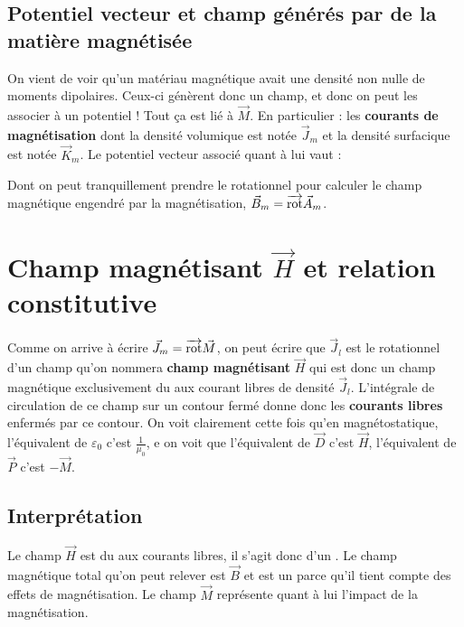 \documentclass[12pt]{book}
\begin{document}
\subsection{Potentiel vecteur et champ générés par de la matière magnétisée}
On vient de voir qu'un matériau magnétique avait une densité non nulle de moments dipolaires. Ceux-ci génèrent  donc un champ, et donc on peut les associer à un potentiel ! Tout ça est lié à $\vec{M}$. En particulier : les \textbf{courants de magnétisation} dont la densité volumique est notée $\vec{J}_m$ et la densité surfacique est notée $\vec{K}_m$. Le potentiel vecteur associé quant à lui vaut :

Dont on peut tranquillement prendre le rotationnel pour calculer le champ magnétique engendré par la magnétisation,  $\vec{B}_m = \overrightarrow{\text{rot}} \vec{A}_m$.
\section{Champ magnétisant $\vec{H}$ et relation constitutive}
Comme on arrive à écrire $\vec{J}_m = \overrightarrow{\text{rot}} \vec{M}$, on peut écrire que $\vec{J}_l$ est le rotationnel d'un champ qu'on nommera \textbf{champ magnétisant} $\vec{H}$ qui est donc un champ magnétique exclusivement du aux courant libres de densité $\vec{J}_l$. L'intégrale de circulation de ce champ sur un contour fermé donne donc les \textbf{courants libres} enfermés par ce contour. On voit clairement cette fois qu'en magnétostatique, l'équivalent de $\varepsilon_0$ c'est $\frac{1}{\mu_0}$, e on voit que l'équivalent de $\vec{D}$ c'est $\vec{H}$, l'équivalent de $\vec{P}$ c'est $-\vec{M}$.

\subsection*{Interprétation}
Le champ $\vec{H}$ est du aux courants libres, il s'agit donc d'un . Le champ magnétique total qu'on peut relever est $\vec{B}$ et est un  parce qu'il tient compte des effets de magnétisation. Le champ $\vec{M}$ représente quant à lui l'impact de la magnétisation.
\end{document}
